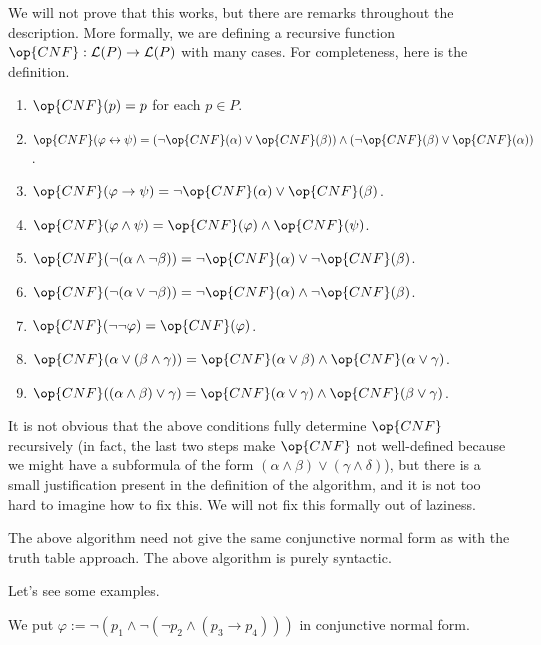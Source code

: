 \documentclass[../notes.tex]{subfiles}
\begin{document}
We will not prove that this works, but there are remarks throughout the description. More formally, we are defining a recursive function $\op{CNF}:\mathcal L(P)\to\mathcal L(P)$ with many cases. For completeness, here is the definition.
\begin{enumerate}
	\item $\op{CNF}(p)=p$ for each $p\in P$.
	\item $\op{CNF}(\varphi\leftrightarrow\psi)=(\lnot\op{CNF}(\alpha)\lor\op{CNF}(\beta))\land(\lnot\op{CNF}(\beta)\lor\op{CNF}(\alpha))$.
	\item $\op{CNF}(\varphi\to\psi)=\lnot\op{CNF}(\alpha)\lor\op{CNF}(\beta)$.
	\item $\op{CNF}(\varphi\land\psi)=\op{CNF}(\varphi)\land\op{CNF}(\psi)$.
	\item $\op{CNF}(\lnot(\alpha\land\lnot\beta))=\lnot\op{CNF}(\alpha)\lor\lnot\op{CNF}(\beta)$.
	\item $\op{CNF}(\lnot(\alpha\lor\lnot\beta))=\lnot\op{CNF}(\alpha)\land\lnot\op{CNF}(\beta)$.
	\item $\op{CNF}(\lnot\lnot\varphi)=\op{CNF}(\varphi)$.
	\item $\op{CNF}(\alpha\lor(\beta\land\gamma))=\op{CNF}(\alpha\lor\beta)\land\op{CNF}(\alpha\lor\gamma)$.
	\item $\op{CNF}((\alpha\land\beta)\lor\gamma)=\op{CNF}(\alpha\lor\gamma)\land\op{CNF}(\beta\lor\gamma)$.
\end{enumerate}
It is not obvious that the above conditions fully determine $\op{CNF}$ recursively (in fact, the last two steps make $\op{CNF}$ not well-defined because we might have a subformula of the form $(\alpha\land\beta)\lor(\gamma\land\delta)$), but there is a small justification present in the definition of the algorithm, and it is not too hard to imagine how to fix this. We will not fix this formally out of laziness.
\begin{remark}
	The above algorithm need not give the same conjunctive normal form as with the truth table approach. The above algorithm is purely syntactic.
\end{remark}
Let's see some examples.
\begin{exe}
	We put $\varphi:=\lnot(p_1\land\lnot(\lnot p_2\land(p_3\to p_4)))$ in conjunctive normal form.
\end{exe}
\end{document}
